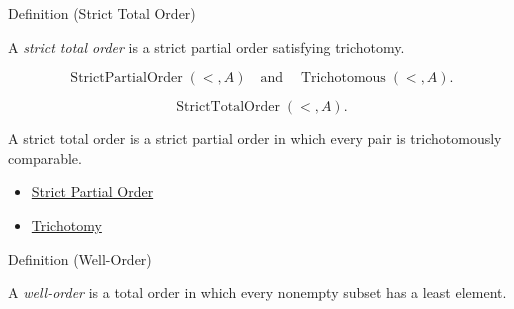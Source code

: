 \begin{definitionbox}{Definition (Strict Total Order)}
\begin{definition}
\label{def:strict-total-order}
A \emph{strict total order} is a strict partial order satisfying trichotomy.
\end{definition}
\end{definitionbox}

\begin{remark*}
\[
\operatorname{StrictPartialOrder}(<,A)
\quad\text{and}\quad
\operatorname{Trichotomous}(<,A).
\]
\end{remark*}

\begin{remark*}
\[
\operatorname{StrictTotalOrder}(<,A).
\]
\end{remark*}

\begin{remark*}[Interpretation]
A strict total order is a strict partial order in which every pair is
trichotomously comparable.
\end{remark*}

\begin{dependencies}
\begin{itemize}
  \item \hyperref[def:strict-partial-order]{Strict Partial Order}
  \item \hyperref[def:trichotomy]{Trichotomy}
\end{itemize}
\end{dependencies}

\begin{topicbox}{Definition (Well-Order)}
\begin{exposition}
A \emph{well-order} is a total order in which every nonempty subset has a
least element.
\end{exposition}
\end{topicbox}
